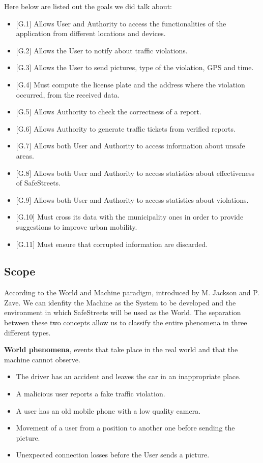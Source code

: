 Here below are listed out the goals we did talk about:

\begin{itemize}
\item {[G.1]} Allows User and Authority to access the functionalities of the application from different locations and devices.
\item {[G.2]} Allows the User to notify about traffic violations.
\item {[G.3]} Allows the User to send pictures, type of the violation, GPS and time.
\item {[G.4]} Must compute the license plate and the address where the violation occurred, from the received data.
\item {[G.5]} Allows Authority to check the correctness of a report.
\item {[G.6]} Allows Authority to generate traffic tickets from verified reports.
\item {[G.7]} Allows both User and Authority to access information about unsafe areas.
\item {[G.8]} Allows both User and Authority to access statistics about effectiveness of SafeStreets.
\item {[G.9]} Allows both User and Authority to access statistics about violations.
\item {[G.10]} Must cross its data with the municipality ones in order to provide suggestions to improve urban mobility.
\item {[G.11]} Must ensure that corrupted information are discarded.


\end{itemize}

\subsection{Scope}
    According to the World and Machine paradigm, introduced by M. Jackson and P. Zave. We can idenfity the Machine as the System to be developed and the environment in which SafeStreets will be used as the World. The separation between these two concepts allow us to classify the entire phenomena in three different types.
    \vspace{0.5cm}
    
    
    \noindent\textbf{World phenomena}, events that take place in the real world and that the machine cannot observe.
    \begin{itemize}
      \item The driver has an accident and leaves the car in an inappropriate place.
      \item A malicious user reports a fake traffic violation.
      \item A user has an old mobile phone with a low quality camera.
      \item Movement of a user from a position to another one before sending the picture.
      \item Unexpected connection losses before the User sends a picture.
    \end{itemize}
    \vspace{0.5cm}
    
